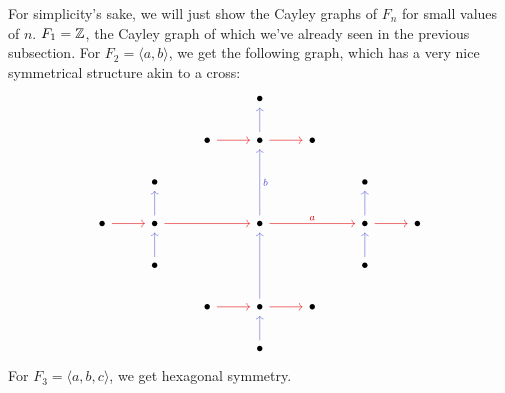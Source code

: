 For simplicity's sake, we will just show the Cayley graphs of $F_n$ for small values of $n$. $F_1 = \mathbb{Z}$, the Cayley graph of which we've already seen in the previous subsection. For $F_2 = \langle a,b \rangle$, we get the following graph, which has a very nice symmetrical structure akin to a cross:
\[\begin{tikzcd}
	&&& \bullet &&& \\
	&& \bullet & \bullet & \bullet \\
	& \bullet &&&& \bullet \\
	\bullet & \bullet && \bullet && \bullet & \bullet \\
	& \bullet &&&& \bullet \\
	&& \bullet & \bullet & \bullet \\
	&&& \bullet
	\arrow[color={rgb,255:red,224;green,0;blue,4}, from=2-3, to=2-4]
	\arrow[color={rgb,255:red,92;green,92;blue,214}, from=2-4, to=1-4]
	\arrow[color={rgb,255:red,224;green,0;blue,4}, from=2-4, to=2-5]
	\arrow[color={rgb,255:red,224;green,0;blue,4}, from=4-1, to=4-2]
	\arrow[color={rgb,255:red,92;green,92;blue,214}, from=4-2, to=3-2]
	\arrow[color={rgb,255:red,224;green,0;blue,4}, from=4-2, to=4-4]
	\arrow["b"', color={rgb,255:red,92;green,92;blue,214}, from=4-4, to=2-4]
	\arrow["a", color={rgb,255:red,224;green,0;blue,4}, from=4-4, to=4-6]
	\arrow[color={rgb,255:red,92;green,92;blue,214}, from=4-6, to=3-6]
	\arrow[color={rgb,255:red,224;green,0;blue,4}, from=4-6, to=4-7]
	\arrow[color={rgb,255:red,92;green,92;blue,214}, from=5-2, to=4-2]
	\arrow[color={rgb,255:red,92;green,92;blue,214}, from=5-6, to=4-6]
	\arrow[color={rgb,255:red,224;green,0;blue,4}, from=6-3, to=6-4]
	\arrow[color={rgb,255:red,92;green,92;blue,214}, from=6-4, to=4-4]
	\arrow[color={rgb,255:red,224;green,0;blue,4}, from=6-4, to=6-5]
	\arrow[color={rgb,255:red,92;green,92;blue,214}, from=7-4, to=6-4]
\end{tikzcd}\]
For $F_3 = \langle a,b,c \rangle$, we get hexagonal symmetry. 

